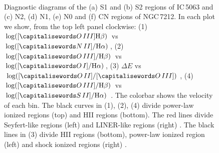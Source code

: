 \documentclass[../main.tex]{subfiles}
\begin{document}
\begin{figure}
\\
\caption[]{Diagnostic diagrams of the (a) S1 and (b) S2 regions of IC\,5063 and (c) N2, (d) N1, (e) N0 and (f) CN  regions of NGC\,7212.  In each plot we show, from the top left panel clockwise: (1) $\log([\ion{O}{III}] \Hb)$ vs $\log([\ion{N}{II}]/ \Ha)$, (2) $\log([\ion{O}{III}]/ \Hb)$ vs $\log([\ion{O}{I}]/ \Ha)$, (3) $\Delta E$ vs $\log([\ion{O}{II}]/[\ion{O}{III}])$, (4) $\log([\ion{O}{III}]/ \Hb)$ vs $\log([\ion{S}{II}]/ \Ha)$ \citep{Baldwin81, Veilleux87}. The colorbar shows the velocity of each bin. The black curves in (1), (2), (4) divide power-law ionized regions (top) and HII regions (bottom). The red lines divide Seyfert-like regions (left) and LINER-like regions (right) \citep{Kewley06}. The black lines in (3) divide HII regions (bottom), power-law ionized region (left) and shock ionized regions (right) \citep{Baldwin81}.   }
\label{fig:diag_n0cnN}
\end{figure}
\end{document}
